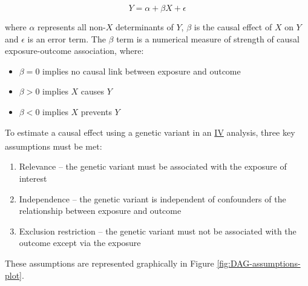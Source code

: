 \documentclass[
]{article}
\providecommand{\tightlist}{%
  \setlength{\itemsep}{0pt}\setlength{\parskip}{0pt}}
\begin{document}
\begin{equation} 
Y = \alpha + \beta X + \epsilon
\end{equation}

where \(\alpha\) represents all non-\(X\) determinants of \(Y\), \(\beta\) is the causal effect of \(X\) on \(Y\) and \(\epsilon\) is an error term. The \(\beta\) term is a numerical measure of strength of causal exposure-outcome association, where:

\begin{itemize}
\tightlist
\item
  \(\beta = 0\) implies no causal link between exposure and outcome
\item
  \(\beta > 0\) implies \(X\) causes \(Y\)
\item
  \(\beta < 0\) implies \(X\) prevents \(Y\)
\end{itemize}

To estimate a causal effect using a genetic variant in an \hyperref[acronyms_IV]{IV} analysis, three key assumptions must be met\textsuperscript{}:

\begin{enumerate}
\def\labelenumi{\arabic{enumi}.}
\tightlist
\item
  Relevance -- the genetic variant must be associated with the exposure of interest
\item
  Independence -- the genetic variant is independent of confounders of the relationship between exposure and outcome
\item
  Exclusion restriction -- the genetic variant must not be associated with the outcome except via the exposure
\end{enumerate}

These assumptions are represented graphically in Figure \ref{fig:DAG-assumptions-plot}.
\end{document}
